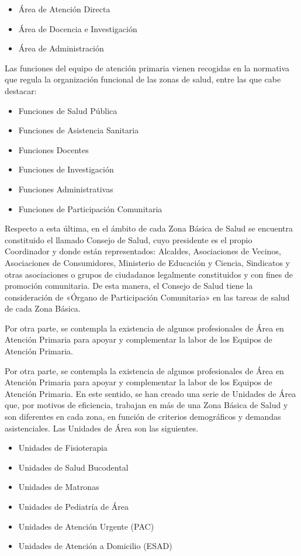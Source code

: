 \begin{itemize}
    \item Área de Atención Directa
    \item Área de Docencia e Investigación
    \item Área de Administración
\end{itemize}

Las funciones del equipo de atención primaria vienen recogidas en la normativa que regula la organización funcional de las zonas de salud, entre las que cabe destacar:

\begin{itemize}
    \item Funciones de Salud Pública
    \item Funciones de Asistencia Sanitaria
    \item Funciones Docentes
    \item Funciones de Investigación
    \item Funciones Administrativas
    \item Funciones de Participación Comunitaria
\end{itemize}

Respecto a esta última, en el ámbito de cada Zona Básica de Salud se encuentra constituido el llamado Consejo de Salud, cuyo presidente es el propio Coordinador y donde están representados: Alcaldes, Asociaciones de Vecinos, Asociaciones de Consumidores, Ministerio de Educación y Ciencia, Sindicatos y otras asociaciones o grupos de ciudadanos legalmente constituidos y con fines de promoción comunitaria. De esta manera, el Consejo de Salud tiene la consideración de «Órgano de Participación Comunitaria» en las tareas de salud de cada Zona Básica.

Por otra parte, se contempla la existencia de algunos profesionales de Área en Atención Primaria para apoyar y complementar la labor de los Equipos de Atención Primaria.

Por otra parte, se contempla la existencia de algunos profesionales de Área en Atención Primaria para apoyar y complementar la labor de los Equipos de Atención Primaria. En este sentido, se han creado una serie de Unidades de Área que, por motivos de eficiencia, trabajan en más de una Zona Básica de Salud y son diferentes en cada zona, en función de criterios demográficos y demandas asistenciales. Las Unidades de Área son las siguientes.

\begin{itemize}
    \item Unidades de Fisioterapia
    \item Unidades de Salud Bucodental
    \item Unidades de Matronas
    \item Unidades de Pediatría de Área
    \item Unidades de Atención Urgente (PAC)
    \item Unidades de Atención a Domicilio (ESAD)
\end{itemize}

